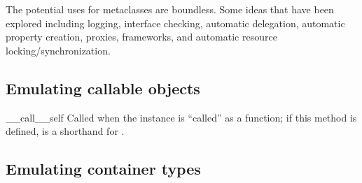 The potential uses for metaclasses are boundless. Some ideas that have
been explored including logging, interface checking, automatic delegation,
automatic property creation, proxies, frameworks, and automatic resource
locking/synchronization.


\subsection{Emulating callable objects\label{callable-types}}

\begin{methoddesc}[object]{__call__}{self}
Called when the instance is ``called'' as a function; if this method
is defined,  is a shorthand for
.
\end{methoddesc}


\subsection{Emulating container types\label{sequence-types}}

